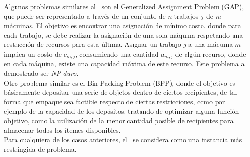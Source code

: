 Algunos problemas similares al \mrp\ son el Generalized Assignment Problem (GAP), que puede ser representado a través de un conjunto de $n$ trabajos y de $m$ máquinas. El objetivo es encontrar una asignación de mínimo costo, donde para cada trabajo, se debe realizar la asignación de una sola máquina respetando una restricción de recursos para esta última. Asignar un trabajo $j$ a una máquina $m$ implica un costo de $c_{m,j}$, consumiendo una cantidad $a_{m,j}$ de algún recurso, donde en cada máquina, existe una capacidad máxima de este recurso. Este problema a demostrado ser \textit{NP-duro}. \\
Otro problema similar es el Bin Packing Problem (BPP), donde el objetivo es básicamente depositar una serie de objetos dentro de ciertos recipientes, de tal forma que empaque sea factible respecto de ciertas restricciones, como por ejemplo de la capacidad de los depósitos, tratando de optimizar alguna función objetivo, como la utilización de la menor cantidad posible de recipientes para almacenar todos los ítemes disponibles. \\
Para cualquiera de los casos anteriores, el \mrp\ se considera como una instancia más restringida de problema.